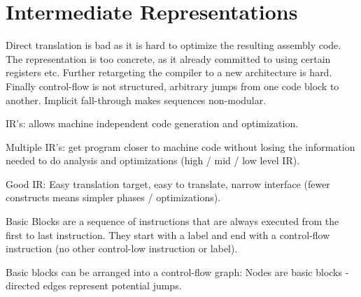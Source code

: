 \section*{Intermediate Representations}

Direct translation is bad as it is hard to optimize the resulting assembly code. The representation is too concrete, as it already committed to using certain registers etc. Further retargeting the compiler to a new architecture is hard. Finally control-flow is not structured, arbitrary jumps from one code block to another. Implicit fall-through makes sequences non-modular. \medskip

IR's: allows machine independent code generation and optimization.\medskip
	
Multiple IR's: get program closer to machine code without losing the information needed to do analysis and optimizations (high / mid / low level IR).\medskip
		
Good IR: Easy translation target, easy to translate, narrow interface (fewer constructs means simpler phases / optimizations).\medskip
	
Basic Blocks are a sequence of instructions that are always executed from the first to last instruction. They start with a label and end with a control-flow instruction (no other control-low instruction or label).\medskip
	
Basic blocks can be arranged into a control-flow graph: Nodes are basic blocks - directed edges represent potential jumps.
